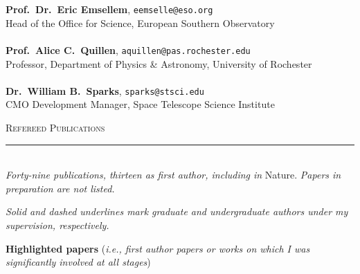 \documentclass[11pt]{article}
\makeatletter
\def\vhrulefill#1{\leavevmode\leaders\hrule\@height#1\hfill \kern\z@}
\makeatother
\begin{document}
{\textbf{Prof.~Dr.~Eric Emsellem}, \texttt{eemselle@eso.org}\\
Head of the Office for Science, European Southern Observatory\\ \\
\textbf{Prof.~Alice C.~Quillen}, \texttt{aquillen@pas.rochester.edu}\\
Professor, Department of Physics \& Astronomy, University of Rochester\\ \\
\textbf{Dr.~William B.~Sparks}, \texttt{sparks@stsci.edu}\\
CMO Development Manager, Space Telescope Science Institute\\
}

\vspace{4mm}


\clearpage

\textsc{Refereed Publications} \vhrulefill{0.4pt}\\


\textit{Forty-nine publications, thirteen as first author, including in} Nature. \textit{Papers in preparation are not listed.}

\textit{Solid and dashed underlines mark graduate and undergraduate authors under my supervision, respectively.}\\

\vspace{-1mm}

\textbf{Highlighted papers} (\textit{i.e., first author papers or works on which I was significantly involved at all stages})\\

\vspace{-4mm}
\end{document}
